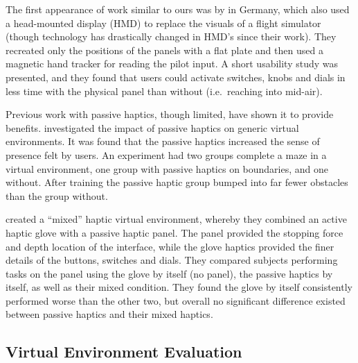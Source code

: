 The first appearance of work similar to ours was by \citet{schiefele_simple_1998} in Germany, which also used a head-mounted display (HMD) to replace the visuals of a flight simulator (though technology has drastically changed in HMD's since their work).
They recreated only the positions of the panels with a flat plate and then used a magnetic hand tracker for reading the pilot input.
A short usability study was presented, and they found that users could activate switches, knobs and dials in less time with the physical panel than without (i.e.\ reaching into mid-air).

Previous work with passive haptics, though limited, have shown it to provide benefits.
\citet{insko_passive_2001} investigated the impact of passive haptics on generic virtual environments.
It was found that the passive haptics increased the sense of presence felt by users.
An experiment had two groups complete a maze in a virtual environment, one group with passive haptics on boundaries, and one without.
After training the passive haptic group bumped into far fewer obstacles than the group without.

\citet{borst_evaluation_2005} created a ``mixed'' haptic virtual environment, whereby they combined an active haptic glove with a passive haptic panel.
The panel provided the stopping force and depth location of the interface, while the glove haptics provided the finer details of the buttons, switches and dials.
They compared subjects performing tasks on the panel using the glove by itself (no panel), the passive haptics by itself, as well as their mixed condition.
They found the glove by itself consistently performed worse than the other two, but overall no significant difference existed between passive haptics and their mixed haptics.

\subsection{Virtual Environment Evaluation}
\label{virtual-environment-evaluation}

